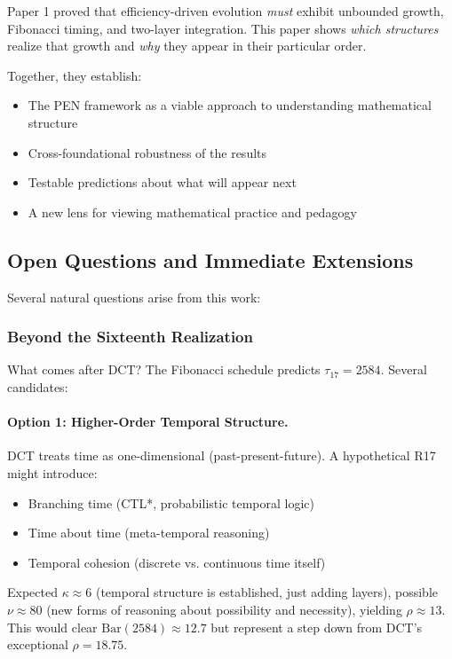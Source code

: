 \documentclass[11pt]{article}
\theoremstyle{definition}
\begin{document}
Paper 1 proved that efficiency-driven evolution \emph{must} exhibit unbounded growth, Fibonacci timing, and two-layer integration. This paper shows \emph{which structures} realize that growth and \emph{why} they appear in their particular order.

Together, they establish:
\begin{itemize}
\item The PEN framework as a viable approach to understanding mathematical structure
\item Cross-foundational robustness of the results
\item Testable predictions about what will appear next
\item A new lens for viewing mathematical practice and pedagogy
\end{itemize}

\subsection{Open Questions and Immediate Extensions}

Several natural questions arise from this work:

\subsubsection{Beyond the Sixteenth Realization}

What comes after DCT? The Fibonacci schedule predicts $\tau_{17} = 2584$. Several candidates:

\paragraph{Option 1: Higher-Order Temporal Structure.}
DCT treats time as one-dimensional (past-present-future). A hypothetical R17 might introduce:
\begin{itemize}
\item Branching time (CTL*, probabilistic temporal logic)
\item Time about time (meta-temporal reasoning)
\item Temporal cohesion (discrete vs. continuous time itself)
\end{itemize}

Expected $\kappa \approx 6$ (temporal structure is established, just adding layers), possible $\nu \approx 80$ (new forms of reasoning about possibility and necessity), yielding $\rho \approx 13$. This would clear $\text{Bar}(2584) \approx 12.7$ but represent a step down from DCT's exceptional $\rho=18.75$.
\end{document}
